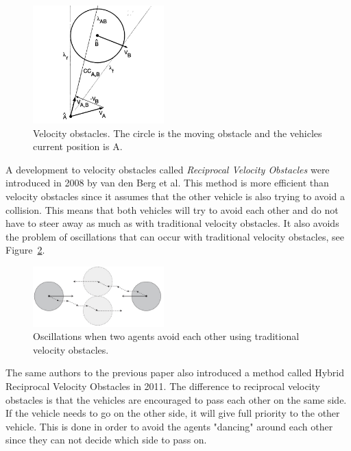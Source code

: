 \documentclass[a4paper,12pt]{article}
\begin{document}
\begin{multicols}{2}
\begin{figure}[H]
  \centering
  \includegraphics[width=0.45\textwidth]{velObstacles.jpg}
  \caption{Velocity obstacles. The circle is the moving obstacle and the vehicles current position is A. \cite{doi:10.1177/027836499801700706}}
  \label{fig:velObstacles}
\end{figure}

A development to velocity obstacles called \emph{Reciprocal Velocity Obstacles} were introduced in 2008 by van den Berg et al. This method is more efficient than velocity obstacles since it assumes that the other vehicle is also trying to avoid a collision. This means that both vehicles will try to avoid each other and do not have to steer away as much as with traditional velocity obstacles. It also avoids the problem of oscillations that can occur with traditional velocity obstacles, see Figure~\ref{fig:reciprocal}.
\cite{van2008reciprocal}

\begin{figure}[H]
  \centering
  \includegraphics[width=0.45\textwidth]{reciprocal.jpg}
  \caption{Oscillations when two agents avoid each other using traditional velocity obstacles. \cite{van2008reciprocal}}
  \label{fig:reciprocal}
\end{figure}

The same authors to the previous paper also introduced a method called Hybrid Reciprocal Velocity Obstacles in 2011. The difference to reciprocal velocity obstacles is that the vehicles are encouraged to pass each other on the same side. If the vehicle needs to go on the other side, it will give full priority to the other vehicle. This is done in order to avoid the agents "dancing" around each other since they can not decide which side to pass on. \cite{snape2011hybrid}


\end{multicols}
\end{document}
